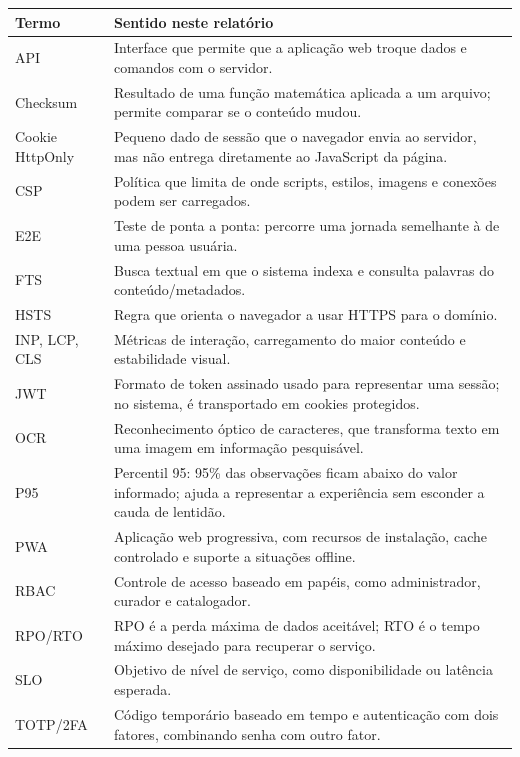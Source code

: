 \documentclass[11pt,a4paper]{article}
\begin{document}
\begin{longtable}{P{0.19\textwidth}P{0.70\textwidth}}
\toprule
\textbf{Termo} & \textbf{Sentido neste relatório} \\
\midrule
\endhead
\bottomrule
\endfoot
API & Interface que permite que a aplicação web troque dados e comandos com o servidor. \\
Checksum & Resultado de uma função matemática aplicada a um arquivo; permite comparar se o conteúdo mudou. \\
Cookie HttpOnly & Pequeno dado de sessão que o navegador envia ao servidor, mas não entrega diretamente ao JavaScript da página. \\
CSP & Política que limita de onde scripts, estilos, imagens e conexões podem ser carregados. \\
E2E & Teste de ponta a ponta: percorre uma jornada semelhante à de uma pessoa usuária. \\
FTS & Busca textual em que o sistema indexa e consulta palavras do conteúdo/metadados. \\
HSTS & Regra que orienta o navegador a usar HTTPS para o domínio. \\
INP, LCP, CLS & Métricas de interação, carregamento do maior conteúdo e estabilidade visual. \\
JWT & Formato de token assinado usado para representar uma sessão; no sistema, é transportado em cookies protegidos. \\
OCR & Reconhecimento óptico de caracteres, que transforma texto em uma imagem em informação pesquisável. \\
P95 & Percentil 95: 95\% das observações ficam abaixo do valor informado; ajuda a representar a experiência sem esconder a cauda de lentidão. \\
PWA & Aplicação web progressiva, com recursos de instalação, cache controlado e suporte a situações offline. \\
RBAC & Controle de acesso baseado em papéis, como administrador, curador e catalogador. \\
RPO/RTO & RPO é a perda máxima de dados aceitável; RTO é o tempo máximo desejado para recuperar o serviço. \\
SLO & Objetivo de nível de serviço, como disponibilidade ou latência esperada. \\
TOTP/2FA & Código temporário baseado em tempo e autenticação com dois fatores, combinando senha com outro fator. \\
\end{longtable}
\end{document}
